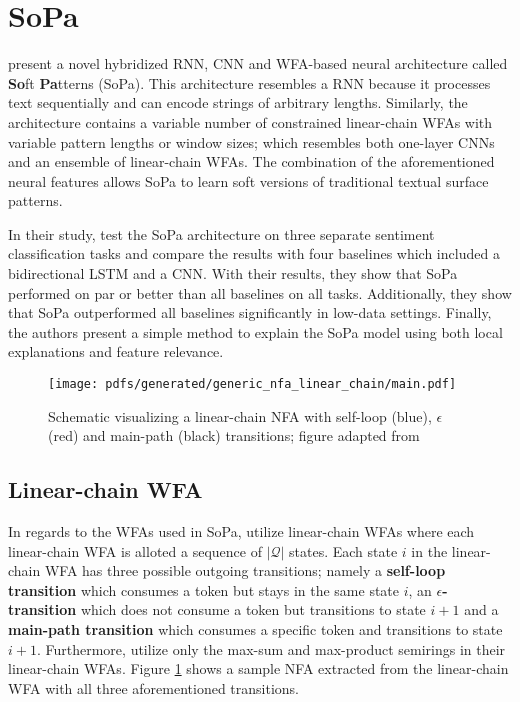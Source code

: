 \section{SoPa}

\label{section:sopa}

\citet{schwartz2018sopa} present a novel hybridized RNN, CNN and WFA-based
neural architecture called \textbf{So}ft \textbf{Pa}tterns (SoPa). This
architecture resembles a RNN because it processes text sequentially and can
encode strings of arbitrary lengths. Similarly, the architecture contains a
variable number of constrained linear-chain WFAs with variable pattern lengths
or window sizes; which resembles both one-layer CNNs and an ensemble of
linear-chain WFAs. The combination of the aforementioned neural features allows
SoPa to learn soft versions of traditional textual surface patterns.

In their study, \citet{schwartz2018sopa} test the SoPa architecture on three
separate sentiment classification tasks and compare the results with four
baselines which included a bidirectional LSTM and a CNN. With their results,
they show that SoPa performed on par or better than all baselines on all tasks.
Additionally, they show that SoPa outperformed all baselines significantly in
low-data settings. Finally, the authors present a simple method to explain the
SoPa model using both local explanations and feature relevance.

\begin{figure}[t]
  \centering
  \texttt{[image: pdfs/generated/generic\_nfa\_linear\_chain/main.pdf]}
  \caption{Schematic visualizing a linear-chain NFA with
    self-loop (blue), $\epsilon$ (red) and main-path (black) transitions; figure
    adapted from \citet{schwartz2018sopa}}
  \label{fig:fa}
\end{figure}

\subsection{Linear-chain WFA}

\label{section:sopa_lc_wfa}

In regards to the WFAs used in SoPa, \citet{schwartz2018sopa} utilize
linear-chain WFAs where each linear-chain WFA is alloted a sequence of
$|\mathcal{Q}|$ states. Each state $i$ in the linear-chain WFA has three
possible outgoing transitions; namely a \textbf{self-loop transition} which
consumes a token but stays in the same state $i$, an
\textbf{$\epsilon$-transition} which does not consume a token but transitions to
state $i+1$ and a \textbf{main-path transition} which consumes a specific token and
transitions to state $i+1$. Furthermore, \citet{schwartz2018sopa} utilize
only the max-sum and max-product semirings in their linear-chain WFAs.
Figure \ref{fig:fa} shows a sample NFA extracted from the linear-chain WFA with all
three aforementioned transitions.

